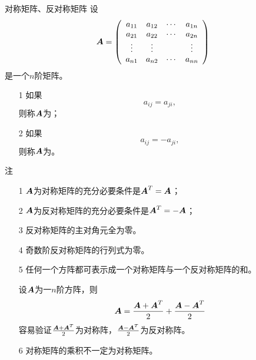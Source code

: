 \begin{frame}
  \begin{footnotesize}
    \begin{block}{对称矩阵、反对称矩阵}
      设
      $$
      \boldsymbol{A} = \left(
      \begin{array}{cccc}
        a_{11} & a_{12} & \cdots & a_{1n} \\
        a_{21} & a_{22} & \cdots & a_{2n} \\
        \vdots   & \vdots &  & \vdots \\
        a_{n1} & a_{n2} & \cdots & a_{nn} 
      \end{array}
      \right)
      $$
      是一个$n$阶矩阵。
      \begin{itemize}
      \item[1]
        如果
        $$
        a_{ij} = a_{ji},
        $$
        则称$\boldsymbol{A}$为；
      \item[2]
        如果
        $$
        a_{ij} = -a_{ji},
        $$
        则称$\boldsymbol{A}$为。
      \end{itemize}      
    \end{block}
  \end{footnotesize}
\end{frame}


\begin{frame}
  \begin{footnotesize}
    \begin{block}{注}
      \begin{itemize}
      \item[1] $\boldsymbol{A}$为对称矩阵的充分必要条件是$\boldsymbol{A}^T=\boldsymbol{A}$；\\[0.2cm] \pause 
      \item[2] $\boldsymbol{A}$为反对称矩阵的充分必要条件是$\boldsymbol{A}^T=-\boldsymbol{A}$；\\[0.2cm] \pause
      \item[3] 反对称矩阵的主对角元全为零。\\[0.2cm] \pause 
      \item[4] 奇数阶反对称矩阵的行列式为零。\\[0.2cm] \pause
      \item[5] 任何一个方阵都可表示成一个对称矩阵与一个反对称矩阵的和。\\[0.2cm] \pause
      \item[]  设$\boldsymbol{A}$为一$n$阶方阵，则
        $$
        \boldsymbol{A} = \frac{\boldsymbol{A}+\boldsymbol{A}^T}2 + \frac{\boldsymbol{A}-\boldsymbol{A}^T}2
        $$
        容易验证$\frac{\boldsymbol{A}+\boldsymbol{A}^T}2$为对称阵，$\frac{\boldsymbol{A}-\boldsymbol{A}^T}2$为反对称阵。 \\[0.2cm] \pause
      \item[6] 对称矩阵的乘积不一定为对称矩阵。\\[0.2cm] \pause
      \item[]  
      \end{itemize}
    \end{block}

  \end{footnotesize}
\end{frame}


